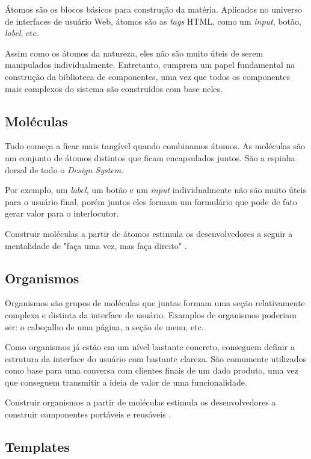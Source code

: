 Átomos são os blocos básicos para construção da matéria. Aplicados no universo de interfaces de usuário Web, átomos são as \textit{tags} HTML, como um \textit{input}, botão, \textit{label}, etc.

Assim como os átomos da natureza, eles não são muito úteis de serem manipulados individualmente. Entretanto, cumprem um papel fundamental na construção da biblioteca de componentes, uma vez que todos os componentes mais complexos do sistema são construídos com base neles.

\subsection{Moléculas}
\label{subsec:moleculas}

Tudo começa a ficar mais tangível quando combinamos átomos. As moléculas são um conjunto de átomos distintos que ficam encapsulados juntos. São a espinha dorsal de todo o \textit{Design System}.

Por exemplo, um \textit{label}, um botão e um \textit{input} individualmente não são muito úteis para o usuário final, porém juntos eles formam um formulário que pode de fato gerar valor para o interlocutor.

Construir moléculas a partir de átomos estimula os desenvolvedores a seguir a mentalidade de "faça uma vez, mas faça direito" \cite{frostAtomicDesign}.

\subsection{Organismos}
\label{subsec:organismos}

Organismos são grupos de moléculas que juntas formam uma seção relativamente complexa e distinta da interface de usuário. Examplos de organismos poderiam ser: o cabeçalho de uma página, a seção de menu, etc.

Como organismos já estão em um nível bastante concreto, conseguem definir a estrutura da interface do usuário com bastante clareza. São comumente utilizados como base para uma conversa com clientes finais de um dado produto, uma vez que conseguem transmitir a ideia de valor de uma funcionalidade.

Construir organismos a partir de moléculas estimula os desenvolvedores a construir componentes portáveis e reusáveis \cite{frostAtomicDesign}.

\subsection{Templates}
\label{subsec:templates}

